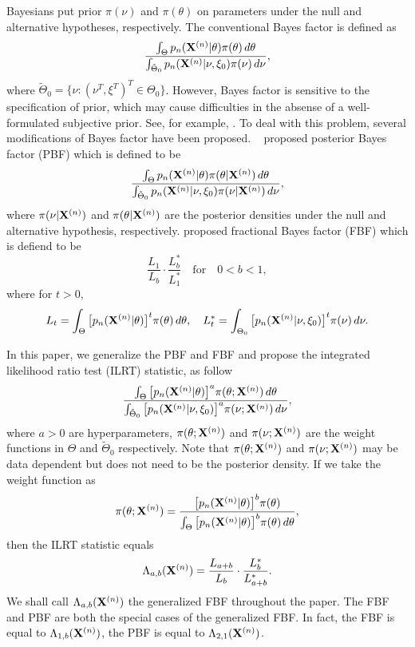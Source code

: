 \documentclass[3p]{elsarticle}
\theoremstyle{plain}
\theoremstyle{definition}
\theoremstyle{remark}
\begin{document}
Bayesians put prior $\pi(\nu)$ and $\pi(\theta)$ on parameters under the null and alternative hypotheses, respectively.
The conventional Bayes factor is defined as
\begin{equation*}
  \frac{\int_{\Theta} p_n(\mathbf{X}^{(n)}|\theta)\pi(\theta)\, d\theta}
    {\int_{\tilde{\Theta}_0}p_n(\mathbf{X}^{(n)}|\nu,\xi_0)\pi(\nu)\, d\nu},
\end{equation*}
where $\tilde{\Theta}_0=\{\nu: (\nu^T,\xi^T)^T\in \Theta_0\}$.
However, Bayes factor is sensitive to the specification of prior, which may cause difficulties in the absense of a well-formulated subjective prior. See, for example, \cite{Lindley1982}.
To deal with this problem, several modifications of Bayes factor have been proposed.
~\cite{Aitkin1991Posterior} proposed posterior Bayes factor (PBF) which is defined to be
\begin{equation*}
    \frac{\int_{\Theta} p_n(\mathbf{X}^{(n)}|\theta)\pi(\theta|\mathbf{X}^{(n)})\, d\theta}{\int_{\tilde{\Theta}_0}p_n(\mathbf{X}^{(n)}|\nu,\xi_0)\pi(\nu|\mathbf{X}^{(n)})\, d\nu},
\end{equation*}
where $\pi(\nu|\mathbf{X}^{(n)})$ and $\pi(\theta|\mathbf{X}^{(n)})$ are the posterior densities under the null and alternative hypothesis, respectively.
\cite{Fractional1995} proposed fractional Bayes factor (FBF) which is defiend to be
\begin{equation*}
    \frac{L_{1}}{L_{b}}\cdot \frac{L_{b}^*}{L_{1}^*}\quad \text{for}\quad 0<b<1,
\end{equation*}
where for $t>0$,
 $$
 L_t=\int_{\Theta}\big[p_n(\mathbf{X}^{(n)}|\theta)\big]^t \pi(\theta)\, d\theta,\quad
 L_t^*=\int_{\Theta_0}\big[p_n(\mathbf{X}^{(n)}|\nu,\xi_0)\big]^t \pi(\nu)\, d\nu.
 $$

 In this paper, we generalize the PBF and FBF and propose the integrated likelihood ratio test (ILRT) statistic, as follow  
\begin{equation}
    \frac{\int_{\Theta} \big[p_n(\mathbf{X}^{(n)}|\theta)\big]^{a}\pi(\theta;\mathbf{X}^{(n)})\,d\theta}{\int_{\tilde{\Theta}_0} \big[p_n(\mathbf{X}^{(n)}|\nu,\xi_0)\big]^{a}\pi(\nu;\mathbf{X}^{(n)})\,d\nu},
\end{equation}
where $a>0$ are  hyperparameters,
 $\pi(\theta;\mathbf{X}^{(n)})$ and $\pi(\nu;\mathbf{X}^{(n)})$ are the weight functions in $\Theta$ and $\tilde{\Theta}_0$ respectively.
Note that $\pi(\theta;\mathbf{X}^{(n)})$ and $\pi(\nu;\mathbf{X}^{(n)})$ may be data dependent but does not need to be the posterior density.
If we take the weight function as
\begin{equation}\label{firstWeight}
\pi(\theta;\mathbf{X}^{(n)})=\frac{\big[p_n(\mathbf{X}^{(n)}|\theta)\big]^b \pi(\theta)}{\int_{\Theta}\big[p_n(\mathbf{X}^{(n)}|\theta)\big]^b \pi(\theta)\, d\theta},
\end{equation}
then the ILRT statistic equals 
$$
    \Lambda_{a,b}(\mathbf{X}^{(n)})=
    \frac{L_{a+b}}{L_{b}}\cdot \frac{L_{b}^*}{L_{a+b}^*}.
$$
We shall call $\Lambda_{a,b}(\mathbf{X}^{(n)})$ the generalized FBF throughout the paper.
The FBF and PBF are both the special cases of the generalized FBF.
In fact, the FBF is equal to $\Lambda_{1,b}(\mathbf{X}^{(n)})$, the PBF is equal to $\Lambda_{2,1}(\mathbf{X}^{(n)})$.
\end{document}
